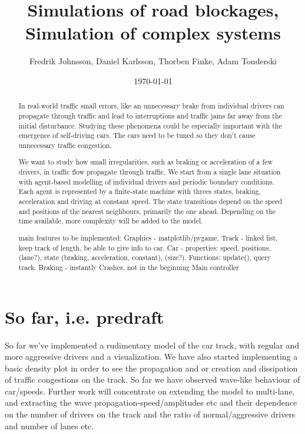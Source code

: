 \documentclass[11pt,a4paper,twocolumn]{article}
\begin{document}
\title{Simulations of road blockages, Simulation of complex systems}
\author{Fredrik Johnsson, Daniel Karlsson, Thorben Finke, Adam Tonderski}
\date{\today}
\maketitle


\begin{abstract}
  In real-world traffic small errors, like an unnecessary brake from individual drivers can propagate through traffic and lead to interruptions and traffic jams far away from the initial disturbance. Studying these phenomena could be especially important with the emergence of self-driving cars. The cars need to be tuned so they don't cause unnecessary traffic congestion.

We want to study how small irregularities, such as braking or acceleration of a few drivers, in traffic flow propagate through traffic. We start from a single lane situation with agent-based modelling of individual drivers and periodic boundary conditions. Each agent is represented by a finite-state machine with threes states, braking, acceleration and driving at constant speed. The state transitions depend on the speed and positions of the nearest neighbours, primarily the one ahead. Depending on the time available, more complexity will be added to the model.  

main features to be implemented:
Graphics - matplotlib/pygame,
Track - linked list, keep track of length, be able to give info to car.
Car - properties: speed, positions, (lane?), state (braking, acceleration, constant), (size?). Functions: update(), query track.
Braking - instantly
Crashes, not in the beginning
Main controller


\end{abstract}

\newpage
\tableofcontents

\section{So far, i.e. predraft}
So far we've implemented a rudimentary model of the car track, with regular and more aggressive drivers and a visualization. We have also started implementing a basic density plot in order to see the propagation and or creation and dissipation of traffic congestions on the track. So far we have observed wave-like behaviour of car/speeds. Further work will concentrate on extending the model to multi-lane, and extracting the wave propagation-speed/amplitudes etc and their dependence on the number of drivers on the track and the ratio of normal/aggressive drivers and number of lanes etc.
\end{document}
